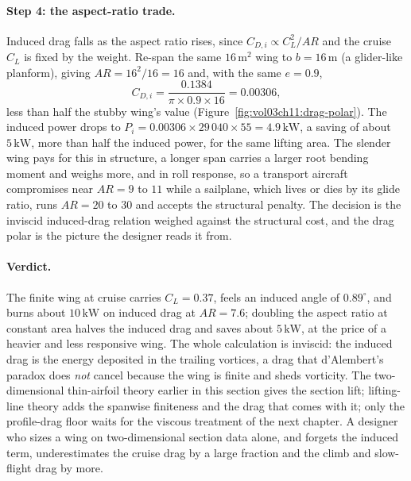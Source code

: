\paragraph{Step 4: the aspect-ratio trade.} Induced drag falls as the
aspect ratio rises, since $C_{D,i}\propto C_L^2/AR$ and the cruise
$C_L$ is fixed by the weight. Re-span the same $16\,\si{\meter}^2$ wing
to $b = 16\,\si{\meter}$ (a glider-like planform), giving $AR =
16^2/16 = 16$ and, with the same $e = 0.9$,
\[
C_{D,i} = \frac{0.1384}{\pi\times 0.9\times 16} = 0.00306,
\]
less than half the stubby wing's value
(Figure~\ref{fig:vol03ch11:drag-polar}). The induced power drops to
$P_i = 0.00306\times 29\,040\times 55 = 4.9\,\text{kW}$, a saving of
about $5\,\text{kW}$, more than half the induced power, for the same
lifting area. The slender wing pays for this in structure, a longer
span carries a larger root bending moment and weighs more, and in
roll response, so a transport aircraft compromises near $AR = 9$ to
$11$ while a sailplane, which lives or dies by its glide ratio, runs
$AR = 20$ to $30$ and accepts the structural penalty. The decision is
the inviscid induced-drag relation weighed against the structural cost,
and the drag polar is the picture the designer reads it from.



\paragraph{Verdict.} The finite wing at cruise carries $C_L = 0.37$,
feels an induced angle of $0.89^\circ$, and burns about
$10\,\text{kW}$ on induced drag at $AR = 7.6$; doubling the aspect
ratio at constant area halves the induced drag and saves about
$5\,\text{kW}$, at the price of a heavier and less responsive wing.
The whole calculation is inviscid: the induced drag is the energy
deposited in the trailing vortices, a drag that d'Alembert's paradox
does \emph{not} cancel because the wing is finite and sheds vorticity.
The two-dimensional thin-airfoil theory earlier in this section gives
the section lift; lifting-line theory adds the spanwise finiteness and
the drag that comes with it; only the profile-drag floor waits for the
viscous treatment of the next chapter. A designer who sizes a wing on
two-dimensional section data alone, and forgets the induced term,
underestimates the cruise drag by a large fraction and the climb and
slow-flight drag by more.

